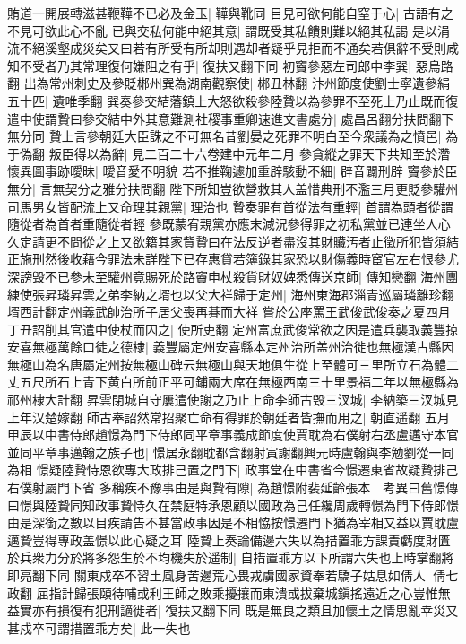 賄道一開展轉滋甚鞭鞾不已必及金玉|{
	鞾與靴同}
目見可欲何能自窒于心|{
	古語有之不見可欲此心不亂}
已與交私何能中絕其意|{
	謂既受其私饋則難以絕其私謁}
是以涓流不絕溪壑成災矣又曰若有所受有所却則遇却者疑乎見拒而不通矣若俱辭不受則咸知不受者乃其常理復何嫌阻之有乎|{
	復扶又翻下同}
初竇參惡左司郎中李巽|{
	惡烏路翻}
出為常州刺史及參貶郴州巽為湖南觀察使|{
	郴丑林翻}
汴州節度使劉士寧遺參絹五十匹|{
	遺唯季翻}
巽奏參交結藩鎮上大怒欲殺參陸贄以為參罪不至死上乃止既而復遣中使謂贄曰參交結中外其意難測社稷事重卿速進文書處分|{
	處昌呂翻分扶問翻下無分同}
贄上言參朝廷大臣誅之不可無名昔劉晏之死罪不明白至今衆議為之憤邑|{
	為于偽翻}
叛臣得以為辭|{
	見二百二十六卷建中元年二月}
參貪縱之罪天下共知至於濳懷異圖事跡曖昧|{
	曖音愛不明貌}
若不推鞠遽加重辟駭動不細|{
	辟音闢刑辟}
竇參於臣無分|{
	言無契分之雅分扶問翻}
陛下所知豈欲營救其人盖惜典刑不濫三月更貶參驩州司馬男女皆配流上又命理其親黨|{
	理治也}
贄奏罪有首從法有重輕|{
	首謂為頭者從謂隨從者為首者重隨從者輕}
參既蒙宥親黨亦應末減況參得罪之初私黨並已連坐人心久定請更不問從之上又欲籍其家貲贄曰在法反逆者盡沒其財贜汚者止徵所犯皆須結正施刑然後收藉今罪法未詳陛下已存惠貸若簿錄其家恐以財傷義時䆠官左右恨參尤深謗毁不已參未至驩州竟賜死於路竇申杖殺貨財奴婢悉傳送京師|{
	傳知戀翻}
海州團練使張昇璘昇雲之弟李納之壻也以父大祥歸于定州|{
	海州東海郡淄青巡屬璘離珍翻壻西計翻定州義武帥治所子居父喪再朞而大祥}
嘗於公座罵王武俊武俊奏之夏四月丁丑詔削其官遣中使杖而囚之|{
	使所吏翻}
定州富庶武俊常欲之因是遣兵襲取義豐掠安喜無極萬餘口徒之德棣|{
	義豐屬定州安喜縣本定州治所盖州治徙也無極漢古縣因無極山為名唐屬定州按無極山碑云無極山與天地俱生從上至體可三里所立石為體二丈五尺所石上青下黄白所前正平可鋪兩大席在無極西南三十里景福二年以無極縣為祁州棣大計翻}
昇雲閉城自守屢遣使謝之乃止上命李師古毁三汊城|{
	李納築三汊城見上年汉楚嫁翻}
師古奉詔然常招聚亡命有得罪於朝廷者皆撫而用之|{
	朝直遥翻}
五月甲辰以中書侍郎趙憬為門下侍郎同平章事義成節度使賈耽為右僕射右丞盧邁守本官並同平章事邁翰之族子也|{
	憬居永翻耽都含翻射寅謝翻興元時盧翰與李勉劉從一同為相}
憬疑陸贄恃恩欲專大政排己置之門下|{
	政事堂在中書省今憬遷東省故疑贄排己右僕射屬門下省}
多稱疾不豫事由是與贄有隙|{
	為趙憬附裴延齡張本　考異曰舊憬傳曰憬與陸贄同知政事贄恃久在禁庭特承恩顧以國政為己任纔周歲轉憬為門下侍郎憬由是深銜之數以目疾請告不甚當政事因是不相恊按憬遷門下猶為宰相又益以賈耽盧邁贄豈得專政盖憬以此心疑之耳}
陸贄上奏論備邊六失以為措置乖方課責虧度財匱於兵衆力分於將多怨生於不均機失於遥制|{
	自措置乖方以下所謂六失也上時掌翻將即亮翻下同}
關東戍卒不習土風身苦邊荒心畏戎虜國家資奉若驕子姑息如倩人|{
	倩七政翻}
屈指計歸張頤待哺或利王師之敗乘擾攘而東潰或拔棄城鎭搖遠近之心豈惟無益實亦有損復有犯刑讁徙者|{
	復扶又翻下同}
既是無良之類且加懷土之情思亂幸災又甚戍卒可謂措置乖方矣|{
	此一失也}
